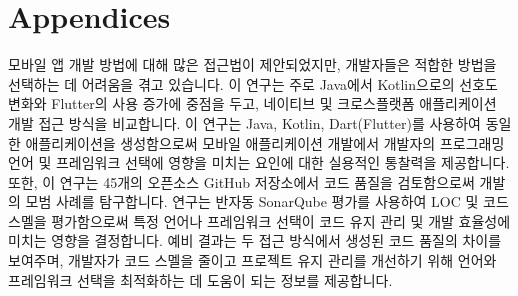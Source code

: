 \documentclass[11pt,jaso]{pnumasterh}
\begin{document}
% 


\nocite{*}


\clearpage

\appendix
\section*{Appendices}

\clearpage

\begin{eabstract}
    모바일 앱 개발 방법에 대해 많은 접근법이 제안되었지만, 개발자들은 적합한 방법을 선택하는 데 어려움을 겪고 있습니다. 이 연구는 주로 Java에서 Kotlin으로의 선호도 변화와 Flutter의 사용 증가에 중점을 두고, 네이티브 및 크로스플랫폼 애플리케이션 개발 접근 방식을 비교합니다. 이 연구는 Java, Kotlin, Dart(Flutter)를 사용하여 동일한 애플리케이션을 생성함으로써 모바일 애플리케이션 개발에서 개발자의 프로그래밍 언어 및 프레임워크 선택에 영향을 미치는 요인에 대한 실용적인 통찰력을 제공합니다. 또한, 이 연구는 45개의 오픈소스 GitHub 저장소에서 코드 품질을 검토함으로써 개발의 모범 사례를 탐구합니다. 연구는 반자동 SonarQube 평가를 사용하여 LOC 및 코드 스멜을 평가함으로써 특정 언어나 프레임워크 선택이 코드 유지 관리 및 개발 효율성에 미치는 영향을 결정합니다. 예비 결과는 두 접근 방식에서 생성된 코드 품질의 차이를 보여주며, 개발자가 코드 스멜을 줄이고 프로젝트 유지 관리를 개선하기 위해 언어와 프레임워크 선택을 최적화하는 데 도움이 되는 정보를 제공합니다.
\end{eabstract}

% 
\end{document}
